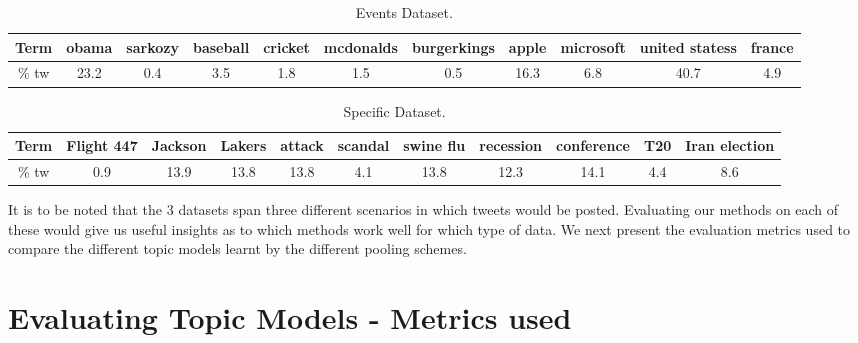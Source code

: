 \documentclass[10pt,a5paper,twoside]{article}
\begin{document}
\begin{table}[!h]
\setcounter{table}{1}
\centering

\resizebox{14cm}{!} 
{
	\begin{tabular}{|c|c|c|c|c|c|c|c|c|c|c|}
	\hline
	Term & obama & sarkozy & baseball & cricket & mcdonalds & burgerkings & apple & microsoft & united statess & france\\
	\hline
	\% tw & 23.2 & 0.4 & 3.5 & 1.8 & 1.5 & 0.5 & 16.3 & 6.8 & 40.7 & 4.9 \\
	\hline
	\end{tabular}
}
\caption{Events Dataset.}\label{Dataset}
\end{table}

\begin{table}[!h]
\setcounter{table}{2}
\centering
\resizebox{14cm}{!} 
{
	\begin{tabular}{|c|c|c|c|c|c|c|c|c|c|c|}
	\hline
	Term & Flight 447 & Jackson & Lakers & attack & scandal & swine flu & recession & conference & T20 & Iran election \\
	\hline
	\% tw & 0.9 & 13.9 & 13.8 & 13.8 & 4.1 & 13.8 & 12.3 & 14.1 & 4.4 & 8.6 \\
	\hline
	\end{tabular}
}
\caption{Specific Dataset.}\label{Table}
\end{table}

It is to be noted that the 3 datasets span three different scenarios in which  tweets would be posted. Evaluating our methods on each of these would give us useful insights as to which methods work well for which type of data. We next present the evaluation metrics used to compare the different topic models learnt by the different pooling schemes. \\


\section{Evaluating Topic Models - Metrics used}
\end{document}
